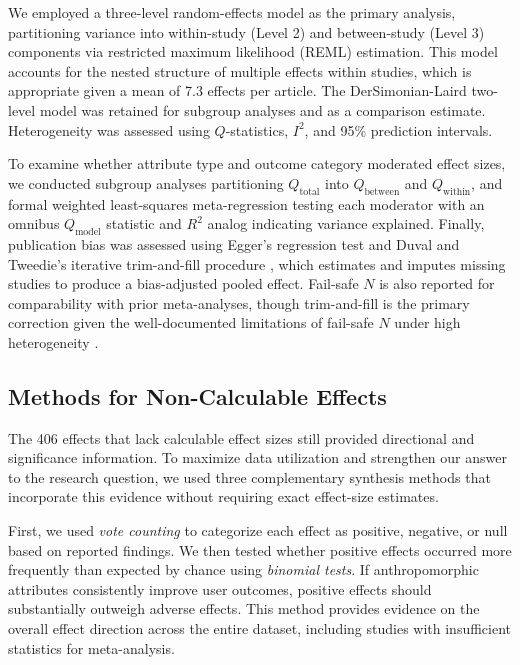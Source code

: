 \documentclass[preprint,review,12pt,authoryear,nonatbib]{elsarticle}
\begin{document}
We employed a three-level random-effects model \parencite{vanden2013three} as the primary analysis, partitioning variance into within-study (Level 2) and between-study (Level 3) components via restricted maximum likelihood (REML) estimation. This model accounts for the nested structure of multiple effects within studies, which is appropriate given a mean of 7.3 effects per article. The DerSimonian-Laird two-level model \parencite{dersimonian1986meta} was retained for subgroup analyses and as a comparison estimate. Heterogeneity was assessed using $Q$-statistics, $I^2$, and 95\% prediction intervals.

To examine whether attribute type and outcome category moderated effect sizes, we conducted subgroup analyses partitioning $Q_{\text{total}}$ into $Q_{\text{between}}$ and $Q_{\text{within}}$, and formal weighted least-squares meta-regression testing each moderator with an omnibus $Q_{\text{model}}$ statistic and $R^2$ analog indicating variance explained.
Finally, publication bias was assessed using Egger's regression test \parencite{egger1997bias} and Duval and Tweedie's iterative trim-and-fill procedure \parencite{duval2000trim}, which estimates and imputes missing studies to produce a bias-adjusted pooled effect. Fail-safe $N$ \parencite{rosenthal1979file} is also reported for comparability with prior meta-analyses, though trim-and-fill is the primary correction given the well-documented limitations of fail-safe $N$ under high heterogeneity \parencite{page2024missingevidence}.

\subsection{Methods for Non-Calculable Effects}

The 406 effects that lack calculable effect sizes still provided directional and significance information. To maximize data utilization and strengthen our answer to the research question, we used three complementary synthesis methods that incorporate this evidence without requiring exact effect-size estimates.

First, we used \textit{vote counting} to categorize each effect as positive, negative, or null based on reported findings. We then tested whether positive effects occurred more frequently than expected by chance using \textit{binomial tests}. If anthropomorphic attributes consistently improve user outcomes, positive effects should substantially outweigh adverse effects. This method provides evidence on the overall effect direction across the entire dataset, including studies with insufficient statistics for meta-analysis. 
\end{document}
